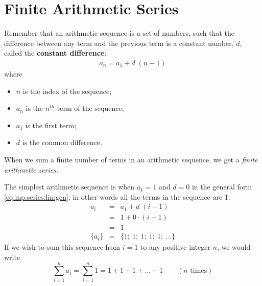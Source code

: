 
\section{Finite Arithmetic Series}

Remember that an arithmetic sequence is a set of numbers, such that the difference between any term and the previous term is a constant number, $d$, called the \textbf{constant difference}:
\begin{eqnarray}
\label{eq:mp:series:lin:gen}
a_n = a_1 + d \; (n - 1)
\end{eqnarray}
where
\begin{itemize}
\item $n$ is the index of the sequence;
\item $a_n$ is the $n^{th}$-term of the sequence;
\item $a_1$ is the first term;
\item $d$ is the common difference.
\end{itemize}

When we sum a finite number of terms in an arithmetic sequence, we get a \textit{finite arithmetic series}.

The simplest arithmetic sequence is when $a_1=1$ and $d=0$ in the general form \eqref{eq:mp:series:lin:gen}; in other words all the terms in the sequence are 1:
\begin{eqnarray*}
a_i &=& a_1 + d \; (i - 1) \\
&=& 1 + 0 \cdot (i - 1) \\
&=& 1 \\
\{a_i\} &=& \{1; \: 1; \: 1; \: 1; \: 1; \: \ldots \}
\end{eqnarray*}
If we wish to sum this sequence from $i=1$ to any positive integer $n$, we would write
\begin{equation*}
\sum_{i=1}^n {a_i} = \sum_{i=1}^n 1 = 1 + 1 + 1 + \ldots + 1 \qquad (n\textrm{ times})
\end{equation*}

